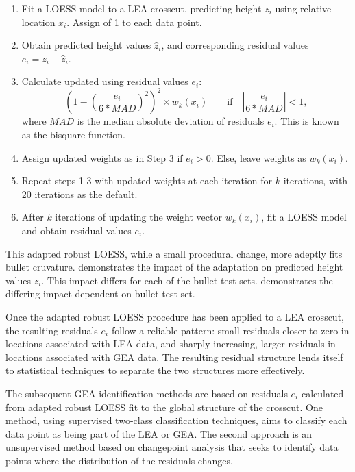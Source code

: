 \documentclass[12pt]{article}
\begin{document}
\begin{enumerate}

\item Fit a LOESS model to a LEA crosscut, predicting height $z_i$ using relative location $x_i$. Assign  of 1 to each data point.  
\item Obtain predicted height values $\widehat{z}_i$, and corresponding residual values $e_i = z_i - \widehat{z}_i$. 
\item Calculate updated  using residual values $e_i$: 
$$\left(1 - \left(\frac{e_i}{6*MAD}\right)^2\right)^2 \times w_k(x_i) \quad \quad \mbox{if}\quad \left|\frac{e_i}{6*MAD} \right| < 1,$$
where $MAD$ is the median absolute deviation of residuals $e_i$. This is known as the bisquare function.  
\item Assign updated weights as in Step 3 if $e_i > 0$. Else, leave weights as $w_k(x_i)$. 
\item Repeat steps 1-3 with updated weights at each iteration for $k$ iterations, with 20 iterations as the default.  
\item After $k$ iterations of updating the weight vector $w_k(x_i)$, fit a LOESS model and obtain residual values $e_i$.  

\end{enumerate}

This adapted robust LOESS, while a small procedural change, more adeptly
fits bullet cruvature. 
demonstrates the impact of the adaptation on predicted height values
\(z_i\). This impact differs for each of the bullet test sets.
 demonstrates the differing
impact dependent on bullet test set.

Once the adapted robust LOESS procedure has been applied to a LEA
crosscut, the resulting residuals \(e_i\) follow a reliable pattern:
small residuals closer to zero in locations associated with LEA data,
and sharply increasing, larger residuals in locations associated with
GEA data. The resulting residual structure lends itself to statistical
techniques to separate the two structures more effectively.

The subsequent GEA identification methods are based on residuals \(e_i\)
calculated from adapted robust LOESS fit to the global structure of the
crosscut. One method, using supervised two-class classification
techniques, aims to classify each data point as being part of the LEA or
GEA. The second approach is an unsupervised method based on changepoint
analysis that seeks to identify data points where the distribution of
the residuals changes.
\end{document}
